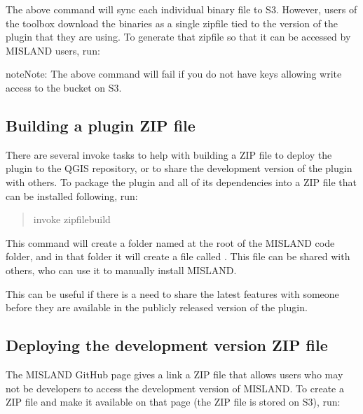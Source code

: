 \documentclass[letterpaper,10pt,english]{sphinxmanual}
\begin{document}
\sphinxAtStartPar
The above command will sync each individual binary file to S3. However, users
of the toolbox download the binaries as a single zipfile tied to the version of
the plugin that they are using. To generate that zipfile so that it can be
accessed by MISLAND users, run:

\begin{sphinxVerbatim}[commandchars=\\\{\}]
 
\end{sphinxVerbatim}

\begin{sphinxadmonition}{note}{Note:}
\sphinxAtStartPar
The above command will fail if you do not have keys allowing write
access to the  bucket on S3.
\end{sphinxadmonition}


\subsection{Building a plugin ZIP file}
\label{\detokenize{Qgis_Plugin/plugin_development:building-a-plugin-zip-file}}
\sphinxAtStartPar
There are several invoke tasks to help with building a ZIP file to deploy the
plugin to the QGIS repository, or to share the development version of the
plugin with others. To package the plugin and all of its dependencies into a
ZIP file that can be installed following, run:
\begin{quote}

\sphinxAtStartPar
invoke zipfile\sphinxhyphen{}build
\end{quote}

\sphinxAtStartPar
This command will create a folder named  at the root of the
MISLAND code folder, and in that folder it will create a file called
. This file can be shared with others, who can use it to manually
install MISLAND.

\sphinxAtStartPar
This can be useful if there is a need to share the latest features with someone
before they are available in the publicly released version of the plugin.


\subsection{Deploying the development version ZIP file}
\label{\detokenize{Qgis_Plugin/plugin_development:deploying-the-development-version-zip-file}}
\sphinxAtStartPar
The MISLAND GitHub page gives a link a ZIP file that allows users who may
not be developers to access the development version of MISLAND. To create
a ZIP file and make it available on that page (the ZIP file is stored on S3),
run:
\end{document}
